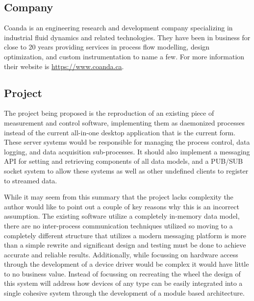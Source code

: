 \documentclass[11pt]{article}
\begin{document}
    \subsection{Company}\label{sec:bg-company}

      Coanda is an engineering research and development company specializing in
      industrial fluid dynamics and related technologies. They have been in
      business for close to 20 years providing services in process flow modelling,
      design optimization, and custom instrumentation to name a few. For more
      information their website is \url{https://www.coanda.ca}.

    \subsection{Project}\label{sec:bg-project}

      The project being proposed is the reproduction of an existing piece of
      measurement and control software, implementing them as daemonized processes
      instead of the current all-in-one desktop application that is the current form.
      These server systems would be responsible for managing the process control,
      data logging, and data acquisition sub-processes. It should also implement a
      messaging API for setting and retrieving components of all data models,
      and a PUB/SUB socket system to allow these systems as well as other undefined
      clients to register to streamed data.

      While it may seem from this summary that the project lacks complexity the
      author would like to point out a couple of key reasons why this is an
      incorrect assumption. The existing software utilize a completely in-memory
      data model, there are no inter-process communication techniques utilized so
      moving to a completely different structure that utilizes a modern messaging
      platform is more than a simple rewrite and significant design and testing
      must be done to achieve accurate and reliable results. Additionally, while
      focussing on hardware access through the development of a device driver would
      be complex it would have little to no business value. Instead of focussing on
      recreating the wheel the design of this system will address how devices of
      any type can be easily integrated into a single cohesive system through the
      development of a module based architecture.

  \newpage
\end{document}
